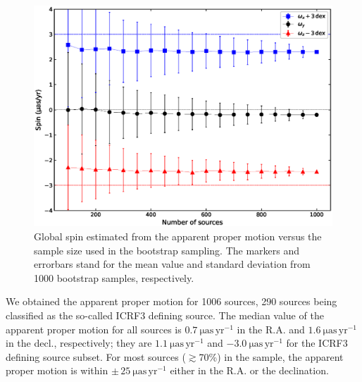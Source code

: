 \documentclass{aa}
\begin{document}
    \begin{figure}
        \label{fig:spin-dist}%
        \centering
        \includegraphics[width=\columnwidth]{figs/spin-from-apm}
        \caption{
        Global spin estimated from the apparent proper motion versus the sample size used in the bootstrap sampling.
        The markers and errorbars stand for the mean value and standard deviation from 1000 bootstrap samples, respectively.
        }
    \end{figure}

    
    We obtained the apparent proper motion for 1006 sources, 290 sources being classified as the so-called ICRF3 defining source.
    The median value of the apparent proper motion for all sources is $\mathrm{0.7~\mu as\,yr^{-1}}$ in the R.A. and $\mathrm{1.6~\mu as\,yr^{-1}}$ in the decl., respectively; they are $\mathrm{1.1~\mu as\,yr^{-1}}$ and $\mathrm{-3.0~\mu as\,yr^{-1}}$ for the ICRF3 defining source subset.
    For most sources ($\gtrsim$70\%) in the sample, the apparent proper motion is within $\mathrm{\pm\,25~\mu as\,yr^{-1}}$ either in the R.A. or the declination.
    
\end{document}
